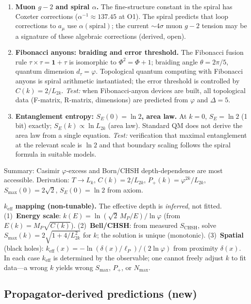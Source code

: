 \documentclass[12pt,a4paper]{article}
\begin{document}
\begin{enumerate}
\item \textbf{Muon $g{-}2$ and spiral $\alpha$.} The fine-structure constant in the spiral has Coxeter corrections ($\alpha^{-1} \approx 137.45$ at O1). The spiral predicts that loop corrections to $a_\mu$ use $\alpha(\text{spiral})$; the current $\sim 4\sigma$ muon $g{-}2$ tension may be a signature of these algebraic corrections (derived, open).

\item \textbf{Fibonacci anyons: braiding and error threshold.} The Fibonacci fusion rule $\tau \times \tau = \mathbf{1} + \tau$ is isomorphic to $\Phi^2 = \Phi + 1$; braiding angle $\theta = 2\pi/5$, quantum dimension $d_\tau = \varphi$. Topological quantum computing with Fibonacci anyons is spiral arithmetic instantiated; the error threshold is controlled by $C(k) = 2/L_{2k}$. \textit{Test:} when Fibonacci-anyon devices are built, all topological data (F-matrix, R-matrix, dimensions) are predicted from $\varphi$ and $\Delta=5$.

\item \textbf{Entanglement entropy: $S_E(0) = \ln 2$, area law.} At $k=0$, $S_E = \ln 2$ (1 bit) exactly; $S_E(k) \propto \ln L_{2k}$ (area law). Standard QM does not derive the area law from a single equation. \textit{Test:} verification that maximal entanglement at the relevant scale is $\ln 2$ and that boundary scaling follows the spiral formula in suitable models.
\end{enumerate}

\noindent Summary: Casimir $\varphi$-excess and Born/CHSH depth-dependence are most accessible. Derivation: $T \to L_k$, $C(k)=2/L_{2k}$, $P_+(k)=\varphi^{2k}/L_{2k}$, $S_{\max}(0)=2\sqrt{2}$, $S_E(0)=\ln 2$ from axiom.

\medskip
\noindent\textbf{$k_{\mathrm{eff}}$ mapping (non-tunable).} The effective depth is \emph{inferred}, not fitted. (1)~\textbf{Energy scale}: $k(E) = \ln(\sqrt{2}\,M_P/E)/\ln\varphi$ (from $E(k) = M_P\sqrt{C(k)}$). (2)~\textbf{Bell/CHSH}: from measured $S_{\mathrm{CHSH}}$, solve $S_{\max}(k) = 2\sqrt{1 + 4/L_{2k}^2}$ for $k$; the solution is unique (monotonic). (3)~\textbf{Spatial} (black holes): $k_{\mathrm{eff}}(x) = -\ln(\delta(x)/\ell_P)/(2\ln\varphi)$ from proximity $\delta(x)$. In each case $k_{\mathrm{eff}}$ is determined by the observable; one cannot freely adjust $k$ to fit data---a wrong $k$ yields wrong $S_{\max}$, $P_+$, or $N_{\max}$.

\subsection{Propagator-derived predictions (new)}
\label{sec:propagator-predictions}
\end{document}
